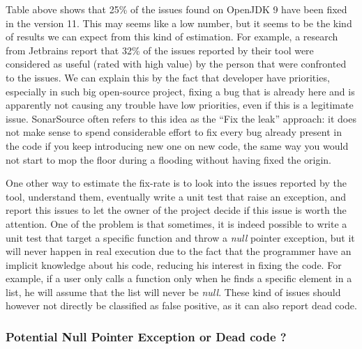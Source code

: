 Table above shows that 25\% of the issues found on OpenJDK 9 have been fixed in the version 11. This may seems like a low number, but it seems to be the kind of results we can expect from this kind of estimation. For example, a research from Jetbrains \cite{Bryksin:2018:DAK:3236454.3236457} report that 32\% of the issues reported by their tool were considered as useful (rated with high value) by the person that were confronted to the issues. 
We can explain this by the fact that developer have priorities, especially in such big open-source project, fixing a bug that is already here and is apparently not causing any trouble have low priorities, even if this is a legitimate issue. 
SonarSource often refers to this idea as the “Fix the leak” approach: it does not make sense to spend considerable effort to fix every bug already present in the code if you keep introducing new one on new code, the same way you would not start to mop the floor during a flooding without having fixed the origin. \newline

One other way to estimate the fix-rate is to look into the issues reported by the tool, understand them, eventually write a unit test that raise an exception, and report this issues to let the owner of the project decide if this issue is worth the attention.
One of the problem is that sometimes, it is indeed possible to write a unit test that target a specific function and throw a \emph{null} pointer exception, but it will never happen in real execution due to the fact that the programmer have an implicit knowledge about his code, reducing his interest in fixing the code. 
For example, if a user only calls a function only when he finds a specific element in a list, he will assume that the list will never be \emph{null}. 
These kind of issues should however not directly be classified as false positive, as it can also report dead code.

\subsubsection{Potential Null Pointer Exception or Dead code ?}
\label{subsubsec:dead_code}



